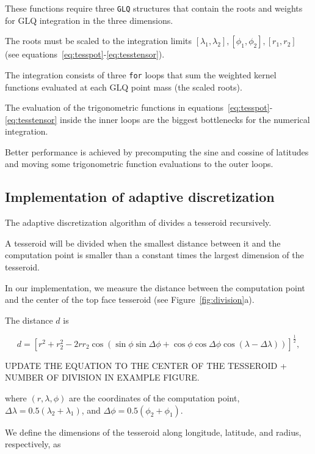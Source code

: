 \documentclass[paper,twocolumn]{geophysics}
\begin{document}
These functions require three \texttt{GLQ} structures that contain the roots
and weights for GLQ integration in the three dimensions.

The roots must be scaled to the
integration limits $[\lambda_1, \lambda_2], [\phi_1, \phi_2], [r_1, r_2]$
(see equations~\ref{eq:tesspot}-\ref{eq:tesstensor}).

The integration consists of three \texttt{for} loops that sum the weighted
kernel functions evaluated at each GLQ point mass (the scaled roots).

The evaluation of the trigonometric functions in
equations~\ref{eq:tesspot}-\ref{eq:tesstensor} inside the inner loops
are the biggest bottlenecks for the numerical integration.

Better performance is achieved by
precomputing the sine and cossine of latitudes
and moving some trigonometric function
evaluations to the outer loops.



\subsection{Implementation of adaptive discretization}


The adaptive discretization algorithm of \citet{Li2011}
divides a tesseroid recursively.

A tesseroid will be divided when the smallest distance between it and the
computation point is smaller than a constant times the largest dimension of the
tesseroid.

In our implementation,
we measure the distance between
the computation point
and the center of the top face tesseroid
(see Figure~\ref{fig:division}a).

The distance $d$ is

\begin{equation}
    d = \left[
        r^2 + r_2^2 - 2 r r_2
        \cos(\sin\phi\sin\Delta\phi + \cos\phi\cos\Delta\phi
            \cos(\lambda - \Delta\lambda))
        \right]^{\frac{1}{2}},
    \label{eq:distance}
\end{equation}


UPDATE THE EQUATION TO THE CENTER OF THE TESSEROID + NUMBER OF DIVISION IN
EXAMPLE FIGURE.

where
$(r, \lambda, \phi)$ are the coordinates of the computation point,
$\Delta\lambda = 0.5(\lambda_2 + \lambda_1)$,
and
$\Delta\phi = 0.5(\phi_2 + \phi_1)$.

We define the dimensions of the tesseroid
along longitude, latitude, and radius, respectively, as
\end{document}
